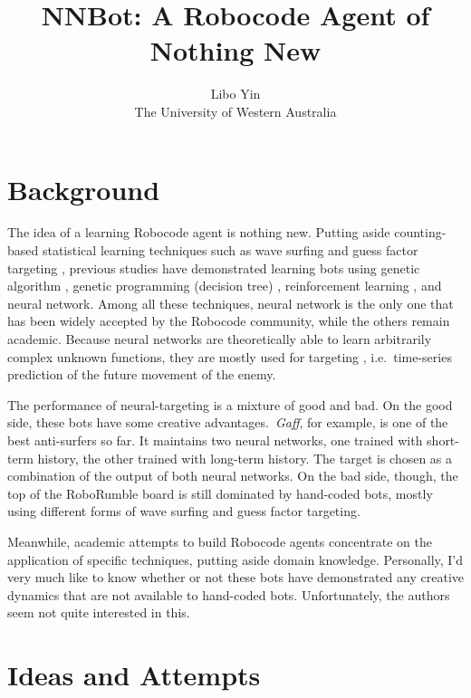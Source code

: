 \documentclass[11pt,a4paper]{article}
\begin{document}
\title{NNBot: A Robocode Agent of Nothing New}
\author{Libo Yin\\The University of Western Australia}
\maketitle

\section{Background}

The idea of a learning Robocode agent is nothing new. Putting aside counting-based statistical learning techniques such as wave surfing \cite{wave_surfing} and guess factor targeting \cite{guess_factor}, previous studies have demonstrated learning bots using genetic algorithm \cite{ga_robocode}, genetic programming (decision tree) \cite{gp_robocode}, reinforcement learning \cite{reinforcement_robocode}, and neural network. Among all these techniques, neural network is the only one that has been widely accepted by the Robocode community, while the others remain academic. Because neural networks are theoretically able to learn arbitrarily complex unknown functions, they are mostly used for targeting \cite{neural_targeting}, i.e.\ time-series prediction of the future movement of the enemy.

The performance of neural-targeting is a mixture of good and bad. On the good side, these bots have some creative advantages.\ \emph{Gaff}, for example, is one of the best anti-surfers so far. It maintains two neural networks, one trained with short-term history, the other trained with long-term history. The target is chosen as a combination of the output of both neural networks. On the bad side, though, the top of the RoboRumble board is still dominated by hand-coded bots, mostly using different forms of wave surfing and guess factor targeting.

Meanwhile, academic attempts to build Robocode agents concentrate on the application of specific techniques, putting aside domain knowledge. Personally, I'd very much like to know whether or not these bots have demonstrated any creative dynamics that are not available to hand-coded bots. Unfortunately, the authors seem not quite interested in this.

\section{Ideas and Attempts}
\end{document}
